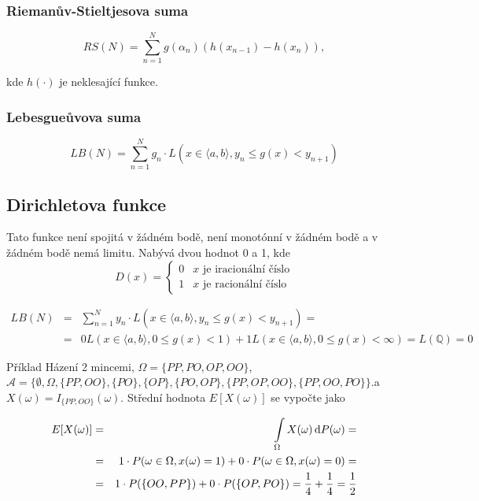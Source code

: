 	\subsubsection*{Riemanův-Stieltjesova suma}
	\[ RS(N) = \sum_{n=1}^N g(\alpha_n)(h(x_{n-1})-h(x_n)),\]
	
	kde $h(\cdot)$ je neklesající funkce.
	
	\subsubsection*{Lebesgueůvova suma}
	\[ LB(N) = \sum_{n=1}^N g_n\cdot L(x\in\langle a, b\rangle, y_n\leq g(x)<y_{n+1})\]
	
	\subsection{Dirichletova funkce}
	Tato funkce není spojitá v žádném bodě,  není monotónní v žádném bodě a v žádném bodě nemá limitu. Nabývá dvou hodnot 0 a 1, kde
	\[ D(x) =
	\begin{cases}
	0 & \text{$x$ je iracionální číslo}\\
	1 & \text{$x$ je racionální číslo}
	\end{cases}
	\]
	
	\begin{eqnarray*}
	LB(N) &=& \sum_{n=1}^N y_n\cdot L(x\in\langle a, b\rangle, y_n\leq g(x)<y_{n+1})=\\
	&=& 0 L(x\in\langle a, b\rangle, 0\leq g(x)<1) + 1 L(x\in\langle a, b\rangle, 0\leq g(x)<\infty) = L(\mathbb{Q})=0
	\end{eqnarray*}
	
	\begin{note}{Příklad}
	Házení 2 mincemi, $\Omega=\{PP,PO,OP,OO\}$,\\$\mathscr{A}=\{\emptyset, \Omega, \{PP,OO\},\{PO\},\{OP\},\{PO,OP\},\{PP,OP,OO\}, \{PP,OO,PO\}\}$.a $X(\omega)=I_{\{PP,OO\}}(\omega)$. Střední hodnota $E[X(\omega)]$ se vypočte jako
	
	\begin{eqnarray*}
	E[X(\omega)] &=& \int\limits_\Omega X(\omega)\,\mathrm{d} P(\omega)=\\
	& = & 1\cdot P(\omega\in\Omega, x(\omega)=1) + 0\cdot P(\omega\in\Omega, x(\omega)=0)=\\
	& = & 1\cdot P(\{OO,PP\}) + 0\cdot P(\{OP,PO\}) = \frac{1}{4}+\frac{1}{4} = \frac{1}{2}
	\end{eqnarray*}
	\end{note}
	
